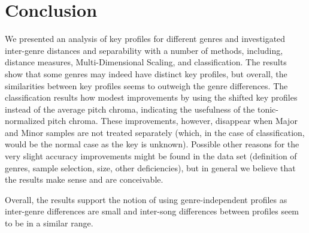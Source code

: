 \documentclass{article}
\begin{document}
\section{Conclusion}
We presented an analysis of key profiles for different genres and investigated inter-genre distances and separability with a number of methods, including, distance measures, Multi-Dimensional Scaling, and classification. The results show that some genres may indeed have distinct key profiles, but overall, the similarities between key profiles seems to outweigh the genre differences. The classification results how modest improvements by using the shifted key profiles instead of the average pitch chroma, indicating the usefulness of the tonic-normalized pitch chroma. These improvements, however, disappear when Major and Minor samples are not treated separately (which, in the case of classification, would be the normal case as the key is unknown). Possible other reasons for the very slight accuracy improvements might be found in the data set (definition of genres, sample selection, size, other deficiencies), but in general we believe that the results make sense and are conceivable.

Overall, the results support the notion of using genre-independent profiles as inter-genre differences are small and inter-song differences between profiles seem to be in a similar range. 

\end{document}
